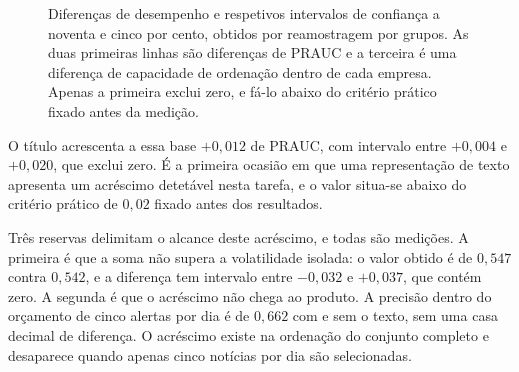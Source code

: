 \begin{figure}[ht]
\centering
{}
\caption[Os três acréscimos, com intervalo de confiança]{Diferenças de desempenho e respetivos
intervalos de confiança a noventa e cinco por cento, obtidos por reamostragem por grupos. As duas
primeiras linhas são diferenças de \gls{PRAUC} e a terceira é uma diferença de capacidade de
ordenação dentro de cada empresa. Apenas a primeira exclui zero, e fá-lo abaixo do critério prático
fixado antes da medição.}
\label{fig:av_acrescimo}
\end{figure}

O título acrescenta a essa base $+0{,}012$ de \gls{PRAUC}, com intervalo entre $+0{,}004$ e
$+0{,}020$, que exclui zero. É a primeira ocasião em que uma representação de texto apresenta um
acréscimo detetável nesta tarefa, e o valor situa-se abaixo do critério prático de $0{,}02$ fixado
antes dos resultados.

Três reservas delimitam o alcance deste acréscimo, e todas são medições. A primeira é que a soma não
supera a volatilidade isolada: o valor obtido é de $0{,}547$ contra $0{,}542$, e a diferença tem
intervalo entre $-0{,}032$ e $+0{,}037$, que contém zero. A segunda é que o acréscimo não chega ao produto. A precisão dentro do orçamento de cinco alertas
por dia é de $0{,}662$ com e sem o texto, sem uma casa decimal de diferença. O acréscimo existe na
ordenação do conjunto completo e desaparece quando apenas cinco notícias por dia são selecionadas.

